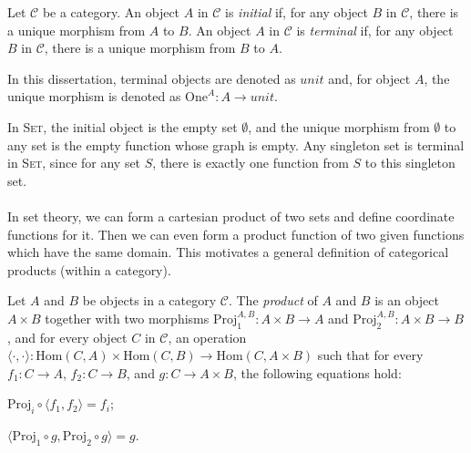 \begin{definition}
\label{definition:ini_ter_obj}
Let $ \mathcal{C} $ be a category. An object $ A $ in $ \mathcal{C} $ is \emph{initial} if, for any object $ B $ in $ \mathcal{C} $, there is a unique morphism from $ A $ to $ B $. An object $ A $ in $ \mathcal{C} $ is \emph{terminal} if, for any object $ B $ in $ \mathcal{C} $, there is a unique morphism from $ B $ to $ A $.
\end{definition}

In this dissertation, terminal objects are denoted as $ unit $ and, for object $ A $, the unique
morphism is denoted as $ \text{One}^A : A \to unit $.

In \textsc{Set}, the initial object is the empty set $ \emptyset $, and the unique morphism from $ \emptyset $ to any set is the empty function whose graph is empty. Any singleton set is terminal in \textsc{Set}, since for any set $ S $, there is exactly one function from $ S $ to this singleton set.
\\
\\
In set theory, we can form a cartesian product of two sets and define coordinate functions for it. Then we can even form a product function of two given functions which have the same domain. This motivates a general definition of categorical products (within a category).

\begin{definition}
\label{definition:products}
Let $ A $ and $ B $ be objects in a category $ \mathcal{C} $. The \emph{product} of $ A $ and $ B $ is an object $ A \times B $ together with two morphisms $ \text{Proj}_1^{A,B}: A \times B \to A $ and $ \text{Proj}_2^{A,B}: A \times B \to B $, and for every object $ C $ in $ \mathcal{C} $, an operation $ \langle \cdot , \cdot \rangle : \text{Hom}(C,A) \times \text{Hom}(C,B) \to \text{Hom}(C, A \times B) $ such that for every $ f_1 : C \to A $, $ f_2 : C \to B $, and $ g : C \to A \times B $, the following equations hold:
\begin{myitemize}
\item $ \text{Proj}_i \circ \langle f_1 , f_2 \rangle = f_i $;
\item $ \langle \text{Proj}_1 \circ g , \text{Proj}_2 \circ g \rangle = g $.
\end{myitemize}
\end{definition}

